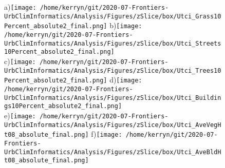 \documentclass{article}
\begin{document}
\begin{figure}
\centering    
{\tiny a)}\texttt{[image: /home/kerryn/git/2020-07-Frontiers-UrbClimInformatics/Analysis/Figures/zSlice/box/Utci\_Grass10Percent\_absolute2\_final.png]}
{\tiny b)}\texttt{[image: /home/kerryn/git/2020-07-Frontiers-UrbClimInformatics/Analysis/Figures/zSlice/box/Utci\_Streets10Percent\_absolute2\_final.png]}\\
{\tiny c)}\texttt{[image: /home/kerryn/git/2020-07-Frontiers-UrbClimInformatics/Analysis/Figures/zSlice/box/Utci\_Trees10Percent\_absolute2\_final.png]}
{\tiny d)}\texttt{[image: /home/kerryn/git/2020-07-Frontiers-UrbClimInformatics/Analysis/Figures/zSlice/box/Utci\_Buildings10Percent\_absolute2\_final.png]}\\
{\tiny e)}\texttt{[image: /home/kerryn/git/2020-07-Frontiers-UrbClimInformatics/Analysis/Figures/zSlice/box/Utci\_AveVegHt08\_absolute\_final.png]}
{\tiny f)}\texttt{[image: /home/kerryn/git/2020-07-Frontiers-UrbClimInformatics/Analysis/Figures/zSlice/box/Utci\_AveBldHt08\_absolute\_final.png]}
\end{figure} 
\clearpage

















\begin{figure}
\centering    
{}
\end{figure} 
\clearpage
\end{document}
